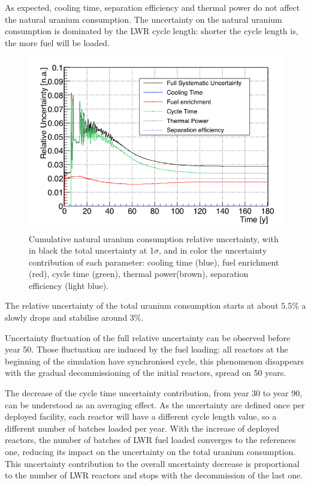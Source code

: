 \documentclass{anstrans}
\begin{document}
As expected, cooling time, separation efficiency and thermal power do not
affect the natural uranium consumption.  The uncertainty on the natural uranium
consumption is dominated by the \gls{LWR} cycle length: shorter the cycle
length is, the more fuel will be loaded.


\begin{figure}[h!!] %
    \centering
    \includegraphics[scale=0.35]{unat_uncer}
    \caption{Cumulative natural uranium consumption relative uncertainty, with
    in black the total uncertainty at 1$\sigma$, and in color the uncertainty
    contribution of each parameter: cooling time (blue), fuel enrichment (red),
    cycle time (green), thermal power(brown), separation efficiency (light
    blue).}\label{fig:unatr_uncer}
\end{figure}
The relative uncertainty of the total uranium consumption starts at about
$5.5\%$ a slowly drops and stabilise around $3\%$.

Uncertainty fluctuation of the full relative uncertainty can be observed before
year 50.  Those fluctuation are induced by the fuel loading: all reactors at the
beginning of the simulation have synchronised cycle, this phenomenon disappears
with the gradual decommissioning of the initial reactors, spread on 50 years.

The decrease of the cycle time uncertainty contribution, from year 30 to year
90, can be understood as an averaging effect.  As the uncertainty are defined once
per deployed facility, each reactor will have a different cycle
length value, so a different number of batches loaded per year.  With the increase
of deployed reactors, the number of batches of \gls{LWR} fuel loaded converges
to the references one, reducing its impact on the uncertainty on the total
uranium consumption. This uncertainty contribution to the overall uncertainty
decrease is proportional to the number of \gls{LWR} reactors and stops with the
decommission of the last one.
\end{document}
